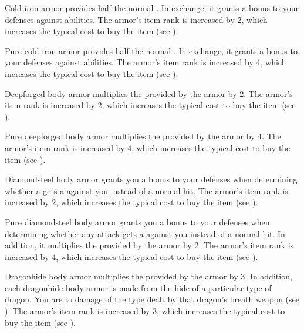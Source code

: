          Cold iron armor provides half the normal .
        In exchange, it grants a  bonus to your defenses against \magical abilities.
        The armor's item rank is increased by 2, which increases the typical cost to buy the item (see ).

         Pure cold iron armor provides half the normal .
        In exchange, it grants a  bonus to your defenses against \magical abilities.
        The armor's item rank is increased by 4, which increases the typical cost to buy the item (see ).

         Deepforged body armor multiplies the  provided by the armor by 2.
        The armor's item rank is increased by 2, which increases the typical cost to buy the item (see ).

         Pure deepforged body armor multiplies the  provided by the armor by 4.
        The armor's item rank is increased by 4, which increases the typical cost to buy the item (see ).

         Diamondsteel body armor grants you a  bonus to your defenses when determining whether a  gets a  against you instead of a normal hit.
        The armor's item rank is increased by 2, which increases the typical cost to buy the item (see ).

         Pure diamondsteel body armor grants you a  bonus to your defenses when determining whether any attack gets a  against you instead of a normal hit.
        In addition, it multiplies the  provided by the armor by 2.
        The armor's item rank is increased by 4, which increases the typical cost to buy the item (see ).

         Dragonhide body armor multiplies the  provided by the armor by 3.
        In addition, each dragonhide body armor is made from the hide of a particular type of dragon.
        You are  to damage of the type dealt by that dragon's breath weapon (see ).
        The armor's item rank is increased by 3, which increases the typical cost to buy the item (see ).

